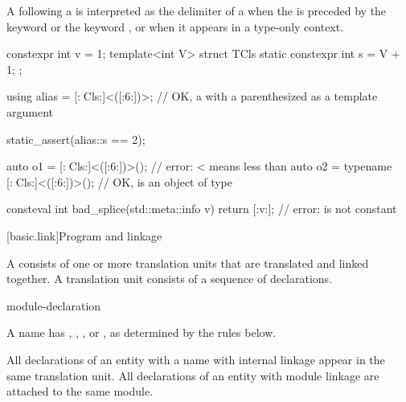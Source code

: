 \pnum
\begin{note}
A \tcode{<} following a  is interpreted as
the delimiter of a 
when the  is preceded by
the keyword  or the keyword , or
when it appears in a type-only context.
\begin{example}
\begin{codeblock}
constexpr int v = 1;
template<int V> struct TCls {
  static constexpr int s = V + 1;
};

using alias = [:^^TCls:]<([:^^v:])>;
  // OK, a  with a parenthesized  as a template argument

static_assert(alias::s == 2);

auto o1 = [:^^TCls:]<([:^^v:])>();              // error: < means less than
auto o2 = typename [:^^TCls:]<([:^^v:])>();     // OK,  is an object of type 

consteval int bad_splice(std::meta::info v) {
  return [:v:];                                 // error:  is not constant
}
\end{codeblock}
\end{example}
\end{note}

[basic.link]{Program and linkage}%

\pnum
{}%
%
A  consists of one or more translation units
that are translated and linked together.
A translation unit consists of a sequence of declarations.

\begin{bnf}
\br
    \br
     module-declaration  
\end{bnf}

\pnum
{}%
A name has
,
,
, or
,
as determined by the rules below.
\begin{note}
All declarations of an entity with a name with internal linkage
appear in the same translation unit.
All declarations of an entity with module linkage
are attached to the same module.
\end{note}

